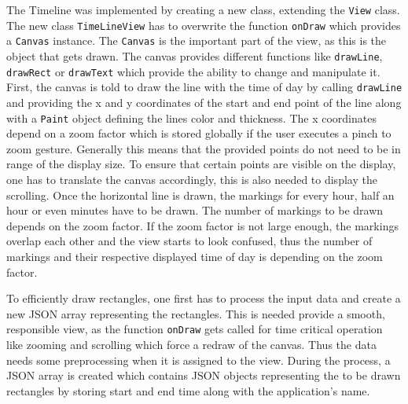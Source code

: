The  Timeline was implemented by creating a new class, extending the \lstinline$View$ class. The new class \lstinline$TimeLineView$ has to overwrite the function \lstinline$onDraw$ which provides a \lstinline$Canvas$ instance. The \lstinline$Canvas$ is the important part of the view, as this is the object that gets drawn. The canvas provides different functions like \lstinline$drawLine$, \lstinline$drawRect$ or \lstinline$drawText$ which provide the ability to change and manipulate it. First, the canvas is told to draw the line with the time of day by calling \lstinline$drawLine$ and providing the x and y coordinates of the start and end point of the line along with a \lstinline$Paint$ object defining the lines color and thickness. The x coordinates depend on a zoom factor which is stored globally if the user executes a pinch to zoom gesture. Generally this means that the provided points do not need to be in range of the display size. To ensure that certain points are visible on the display, one has to translate the canvas accordingly, this is also needed to display the scrolling. Once the horizontal line is drawn, the markings for every hour,  half an hour or even minutes have to be drawn. The number of markings to be drawn depends on the zoom factor. If the zoom factor is not large enough, the markings overlap each other and the view starts to look confused, thus the number of markings and their respective displayed time of day is depending on the zoom factor.

To  efficiently draw rectangles, one first has to process the input data and create a new JSON array representing the rectangles. This is needed provide a smooth, responsible view, as the function \lstinline$onDraw$ gets called for time critical operation like zooming and scrolling which force a redraw of the canvas. Thus the data needs some preprocessing when it is assigned to the view. During the process, a JSON array is created which contains JSON objects representing the to be drawn rectangles by storing start and end time along with the application's name. 

